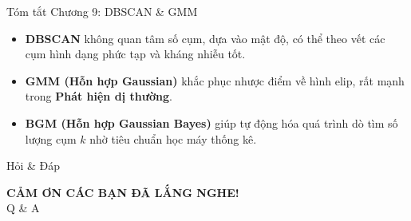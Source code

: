 \documentclass[aspectratio=169]{beamer}
\begin{document}
\begin{frame}{Tóm tắt Chương 9: DBSCAN \& GMM}
    \begin{itemize}
        \item \textbf{DBSCAN} không quan tâm số cụm, dựa vào mật độ, có thể theo vết các cụm hình dạng phức tạp và kháng nhiễu tốt.
        \item \textbf{GMM (Hỗn hợp Gaussian)} khắc phục nhược điểm về hình elip, rất mạnh trong \textbf{Phát hiện dị thường}.
        \item \textbf{BGM (Hỗn hợp Gaussian Bayes)} giúp tự động hóa quá trình dò tìm số lượng cụm $k$ nhờ tiêu chuẩn học máy thống kê.
    \end{itemize}
\end{frame}

\begin{frame}{Hỏi \& Đáp}
    \begin{center}
        \Large{\textbf{CẢM ƠN CÁC BẠN ĐÃ LẮNG NGHE!}}\\
        \vspace{1cm}
        Q \& A
    \end{center}
\end{frame}
\end{document}
